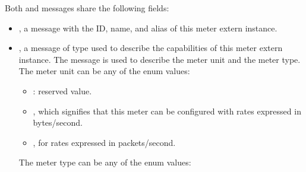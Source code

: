 \documentclass[11pt]{article}
\begin{document}
{%
\noindent{}Both  and  messages share the following fields:%

\begin{itemize}%

\item{}
, a  message with the ID, name, and alias of this meter
extern instance.%

\item{}
, a message of type  used to describe the capabilities of
this meter extern instance. The  message is used to describe the
meter unit and the meter type. The meter unit can be any of the
 enum values:%

\begin{itemize}[noitemsep,topsep=\mdcompacttopsep]%

\item{}: reserved value.%

\item{}, which signifies that this meter can be configured with rates
expressed in bytes/second.%

\item{}, for rates expressed in packets/second.%
\end{itemize}%

The meter type can be any of the  enum values:%


\end{itemize}}
\end{document}
